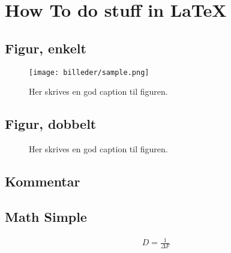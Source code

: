 \newpage
\section{How To do stuff in LaTeX}

\subsection*{Figur, enkelt}
\begin{figure}[h!]
	\centering
		\texttt{[image: billeder/sample.png]}
	\caption{Her skrives en god caption til figuren.}
	\label{fig:sample_fig_ref_her}
\end{figure}
\FloatBlock

\subsection*{Figur, dobbelt}
\begin{figure}
	\centering
  	\caption{Her skrives en god caption til figuren.}
	\label{fig:sample_fig_ref_her_samlet}
\end{figure}
\FloatBlock

\subsection*{Kommentar}

\subsection*{Math Simple}
\begin{align}
D = \frac{1}{\Delta F}
\end{align}

